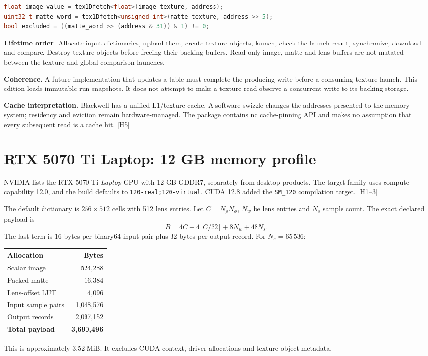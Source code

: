\documentclass[11pt,a4paper]{article}
\newcommand{\hw}[1]{\textcolor{muted}{[H#1]}}
\newcommand{\code}[1]{\texttt{#1}}
\begin{document}
\begin{lstlisting}[language=C++]
float image_value = tex1Dfetch<float>(image_texture, address);
uint32_t matte_word = tex1Dfetch<unsigned int>(matte_texture, address >> 5);
bool excluded = ((matte_word >> (address & 31)) & 1) != 0;
\end{lstlisting}

\textbf{Lifetime order.} Allocate input dictionaries, upload them, create texture objects, launch, check the launch result, synchronize, download and compare. Destroy texture objects before freeing their backing buffers. Read-only image, matte and lens buffers are not mutated between the texture and global comparison launches.

\textbf{Coherence.} A future implementation that updates a table must complete the producing write before a consuming texture launch. This edition loads immutable run snapshots. It does not attempt to make a texture read observe a concurrent write to its backing storage.

\textbf{Cache interpretation.} Blackwell has a unified L1/texture cache. A software swizzle changes the addresses presented to the memory system; residency and eviction remain hardware-managed. The package contains no cache-pinning API and makes no assumption that every subsequent read is a cache hit. \hw{5}
\clearpage

\section{RTX 5070 Ti Laptop: 12 GB memory profile}
NVIDIA lists the RTX 5070 Ti \emph{Laptop} GPU with 12 GB GDDR7, separately from desktop products. The target family uses compute capability 12.0, and the build defaults to \code{120-real;120-virtual}. CUDA 12.8 added the \code{SM\_120} compilation target. \hw{1--3}

The default dictionary is $256\times512$ cells with 512 lens entries. Let $C=N_\rho N_\phi$, $N_w$ be lens entries and $N_s$ sample count. The exact declared payload is
\begin{equation}
B=4C+4\lceil C/32\rceil+8N_w+48N_s.
\end{equation}
The last term is 16 bytes per binary64 input pair plus 32 bytes per output record. For $N_s=65\,536$:
\begin{center}
\begin{tabularx}{\textwidth}{@{}Yr@{}}\toprule
\textbf{Allocation} & \textbf{Bytes}\\\midrule
Scalar image & 524,288\\
Packed matte & 16,384\\
Lens-offset LUT & 4,096\\
Input sample pairs & 1,048,576\\
Output records & 2,097,152\\\midrule
\textbf{Total payload} & \textbf{3,690,496}\\\bottomrule
\end{tabularx}
\end{center}
This is approximately 3.52 MiB. It excludes CUDA context, driver allocations and texture-object metadata.
\end{document}
